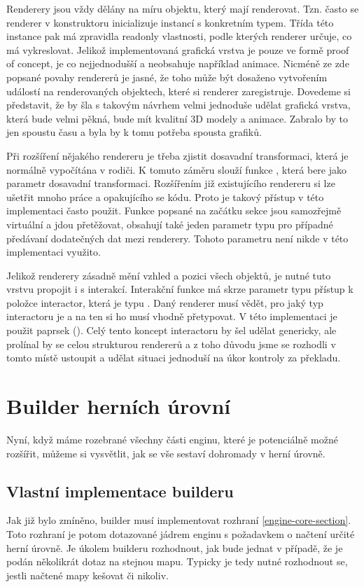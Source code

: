Renderery jsou vždy dělány na míru objektu, který mají renderovat. Tzn. často se renderer v konstruktoru 
inicializuje instancí s konkretním typem. Třída této instance pak má zpravidla readonly vlastnosti,
podle kterých renderer určuje, co má vykreslovat. Jelikož implementovaná grafická vrstva je pouze ve formě proof of concept,
je co nejjednodušší a neobsahuje například animace. Nicméně ze zde popsané povahy rendererů je jasné, že 
toho může být dosaženo vytvořením událostí na renderovaných objektech, které si renderer zaregistruje.
Dovedeme si představit, že by šla s takovým návrhem velmi jednoduše udělat grafická vrstva, která bude
velmi pěkná, bude mít kvalitní 3D modely a animace. Zabralo by to jen spoustu času a byla by k tomu potřeba spousta grafiků.

Při rozšíření nějakého rendereru je třeba zjistit dosavadní transformaci, která je normálně vypočítána v rodiči.
K tomuto záměru slouží funkce , která bere jako parametr dosavadní transformaci.
Rozšířením již existujícího rendereru si lze ušetřit mnoho práce a opakujícího se kódu. Proto je takový přístup v této implementaci často použit.
Funkce popsané na začátku sekce jsou samozřejmě virtuální a jdou přetěžovat,
obsahují také jeden parametr typu  pro případné předávaní dodatečných dat mezi renderery. Tohoto parametru není nikde v této implementaci využito.

Jelikož renderery zásadně mění vzhled a pozici všech objektů, je nutné tuto vrstvu propojit i s interakcí.
Interakční funkce má skrze parametr typu   přístup k položce interactor, která je typu .
Daný renderer musí vědět, pro jaký typ interactoru je a na ten si ho musí vhodně přetypovat. V této implementaci je použit paprsek  (). 
Celý tento koncept interactoru by šel udělat genericky, ale prolínal by se celou strukturou rendererů a z toho
důvodu jsme se rozhodli v tomto místě ustoupit a udělat situaci jednoduší na úkor kontroly za překladu.

\section{Builder herních úrovní}\label{level-builder}
Nyní, když máme rozebrané všechny části enginu, které je potenciálně možné rozšířit, můžeme si vysvětlit, jak
se vše sestaví dohromady v herní úrovně.

\subsection{Vlastní implementace builderu}\label{custom-builder}
Jak již bylo zmíněno, builder musí implementovat rozhraní  \vref{engine-core-section}. Toto rozhraní je
potom dotazované jádrem enginu s požadavkem o načtení určité herní úrovně. Je úkolem builderu rozhodnout, jak bude jednat
v případě, že je podán několikrát dotaz na stejnou mapu. Typicky je tedy nutné rozhodnout
se, jestli načtené mapy kešovat či nikoliv. 

